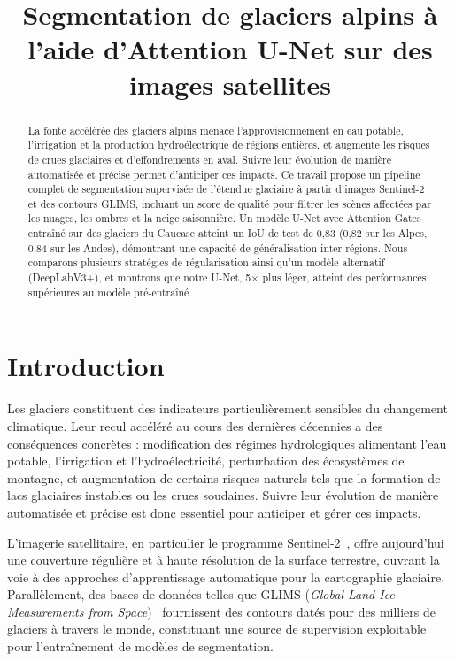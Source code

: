\documentclass[11pt]{article}
\title{Segmentation de glaciers alpins à l'aide d'Attention U-Net sur des images satellites}
\author[1]{\nameemail{Pierre Emery}{pierre.emery@umontreal.ca}}
\author[1]{\nameemail{Mohamed Atmani}{mohamed.atmani@umontreal.ca}}
\author[1]{\nameemail{Fatou Ndao}{fatou.ndao@umontreal.ca}}
\affil[1]{Université de Montréal}
\begin{document}
 
\maketitle
 
 
\begin{abstract}
 La fonte accélérée des glaciers alpins menace l'approvisionnement en eau potable, l'irrigation et la production hydroélectrique de régions entières, et augmente les risques de crues glaciaires et d'effondrements en aval. Suivre leur évolution de manière automatisée et précise permet d'anticiper ces impacts. Ce travail propose un pipeline complet de segmentation supervisée de l'étendue glaciaire à partir d'images Sentinel-2 et des contours GLIMS, incluant un score de qualité pour filtrer les scènes affectées par les nuages, les ombres et la neige saisonnière. Un modèle U-Net avec Attention Gates entraîné sur des glaciers du Caucase atteint un IoU de test de 0{,}83 (0{,}82 sur les Alpes, 0{,}84 sur les Andes), démontrant une capacité de généralisation inter-régions. Nous comparons plusieurs stratégies de régularisation ainsi qu'un modèle alternatif (DeepLabV3+), et montrons que notre U-Net, 5$\times$ plus léger, atteint des performances supérieures au modèle pré-entraîné.
\end{abstract}
 
\section{Introduction}
 
Les glaciers constituent des indicateurs particulièrement sensibles du changement climatique. Leur recul accéléré au cours des dernières décennies a des conséquences concrètes : modification des régimes hydrologiques alimentant l'eau potable, l'irrigation et l'hydroélectricité, perturbation des écosystèmes de montagne, et augmentation de certains risques naturels tels que la formation de lacs glaciaires instables ou les crues soudaines. Suivre leur évolution de manière automatisée et précise est donc essentiel pour anticiper et gérer ces impacts.
 
L'imagerie satellitaire, en particulier le programme Sentinel-2~\citep{drusch2012sentinel}, offre aujourd'hui une couverture régulière et à haute résolution de la surface terrestre, ouvrant la voie à des approches d'apprentissage automatique pour la cartographie glaciaire. Parallèlement, des bases de données telles que GLIMS
(\textit{Global Land Ice Measurements from Space})~%
\citep{raup2007glims} fournissent des contours datés pour des milliers de glaciers à travers le monde, constituant une source de supervision exploitable pour l'entraînement de modèles de segmentation.
 
\end{document}
